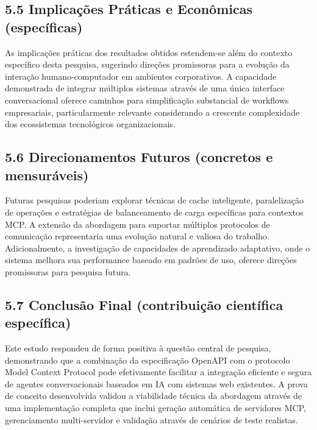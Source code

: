 \documentclass[
]{article}
\begin{document}
\subsection{5.5 Implicações Práticas e Econômicas
(específicas)}\label{implicauxe7uxf5es-pruxe1ticas-e-econuxf4micas-especuxedficas}

As implicações práticas dos resultados obtidos estendem-se além do
contexto específico desta pesquisa, sugerindo direções promissoras para
a evolução da interação humano-computador em ambientes corporativos. A
capacidade demonstrada de integrar múltiplos sistemas através de uma
única interface conversacional oferece caminhos para simplificação
substancial de workflows empresariais, particularmente relevante
considerando a crescente complexidade dos ecossistemas tecnológicos
organizacionais.

\subsection{5.6 Direcionamentos Futuros (concretos e
mensuráveis)}\label{direcionamentos-futuros-concretos-e-mensuruxe1veis}

Futuras pesquisas poderiam explorar técnicas de cache inteligente,
paralelização de operações e estratégias de balanceamento de carga
específicas para contextos MCP. A extensão da abordagem para suportar
múltiplos protocolos de comunicação representaria uma evolução natural e
valiosa do trabalho. Adicionalmente, a investigação de capacidades de
aprendizado adaptativo, onde o sistema melhora sua performance baseado
em padrões de uso, oferece direções promissoras para pesquisa futura.

\subsection{5.7 Conclusão Final (contribuição científica
específica)}\label{conclusuxe3o-final-contribuiuxe7uxe3o-cientuxedfica-especuxedfica}

Este estudo respondeu de forma positiva à questão central de pesquisa,
demonstrando que a combinação da especificação OpenAPI com o protocolo
Model Context Protocol pode efetivamente facilitar a integração
eficiente e segura de agentes conversacionais baseados em IA com
sistemas web existentes. A prova de conceito desenvolvida validou a
viabilidade técnica da abordagem através de uma implementação completa
que inclui geração automática de servidores MCP, gerenciamento
multi-servidor e validação através de cenários de teste realistas.
\end{document}
